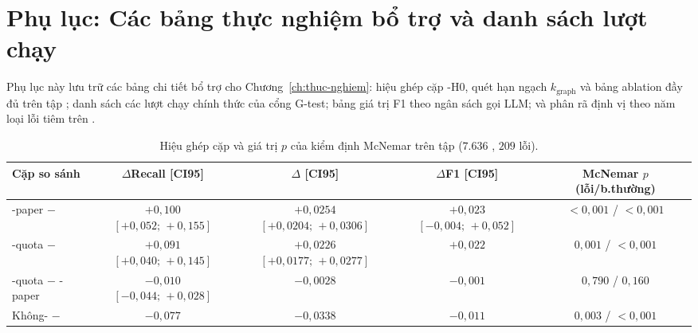 \newpage
\section{Phụ lục: Các bảng thực nghiệm bổ trợ và danh sách lượt chạy}
\label{app:tables}

Phụ lục này lưu trữ các bảng chi tiết bổ trợ cho Chương~\ref{ch:thuc-nghiem}: hiệu ghép cặp \hyp{H0}, quét hạn ngạch $k_{\text{graph}}$ và bảng ablation đầy đủ trên tập ; danh sách các lượt chạy chính thức của cổng G-test; bảng giá trị F1 theo ngân sách gọi LLM; và phân rã định vị  theo năm loại lỗi tiêm trên .

\begin{table}[H]
  \centering
  \caption[Hiệu ghép cặp và kiểm định McNemar cho H0 trên tập val]{Hiệu ghép cặp và giá trị $p$ của kiểm định McNemar trên tập  ($7.636$ , $209$ lỗi).}
  \label{tab:ch5-val-h0-diff}
  \fontsize{8.5pt}{11.5pt}\selectfont
  \tblsetup
  \setlength{\tabcolsep}{2pt}
  \begin{tabularx}{\linewidth}{|Y|c|c|c|c|}
    \hline
    \textbf{Cặp so sánh} & \textbf{$\Delta$Recall [CI95]} & \textbf{$\Delta$ [CI95]} & \textbf{$\Delta$F1 [CI95]} & \textbf{McNemar $p$ (lỗi/b.thường)} \\
    \hline
    -paper $-$  & $+0{,}100$ $[+0{,}052;\, +0{,}155]$ & $+0{,}0254$ $[+0{,}0204;\, +0{,}0306]$ & $+0{,}023$ $[-0{,}004;\, +0{,}052]$ & $< 0{,}001$ / $< 0{,}001$ \\
    \hline
    -quota $-$  & $+0{,}091$ $[+0{,}040;\, +0{,}145]$ & $+0{,}0226$ $[+0{,}0177;\, +0{,}0277]$ & $+0{,}022$ & $0{,}001$ / $< 0{,}001$ \\
    \hline
    -quota $-$ -paper & $-0{,}010$ $[-0{,}044;\, +0{,}028]$ & $-0{,}0028$ & $-0{,}001$ & $0{,}790$ / $0{,}160$ \\
    \hline
    Không- $-$  & $-0{,}077$ & $-0{,}0338$ & $-0{,}011$ & $0{,}003$ / $< 0{,}001$ \\
    \hline
  \end{tabularx}
\end{table}

